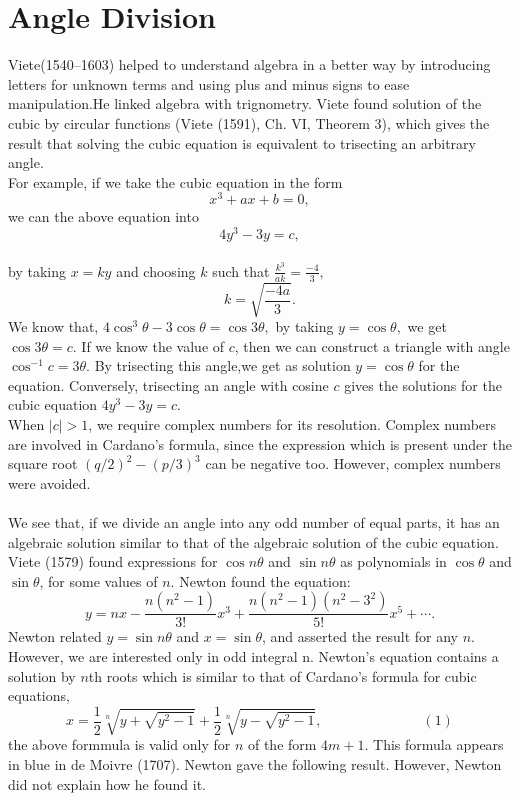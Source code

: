 \documentclass[a4paper,reqno,11pt]{amsart}
\theoremstyle{plain}%
\theoremstyle{definition}
\theoremstyle{remark}
\begin{document}
\section{Angle Division}
Viete(1540–1603) helped to understand algebra in a better way by introducing letters for unknown terms and using plus and minus signs
to ease manipulation.He linked algebra with trignometry. Viete found solution of the cubic by circular functions (Viete (1591),
Ch. VI, Theorem 3), which gives the result that solving the cubic equation is equivalent to trisecting an arbitrary angle.\\
For example, if we take the cubic equation in the form
$$x^3 + ax + b = 0,$$
we can the above equation into
$$4y^3 - 3y = c,$$\\
by taking $x = ky$ and choosing $k$ such that $\frac{k^3}{ak} = \frac{-4}{3},$
$$k = \sqrt{\frac{-4a}{3}}.$$
We know that, $4\cos^3\theta - 3\cos\theta = \cos3\theta,$ by taking $y = \cos\theta,$ we get $\cos3\theta = c.$
If we know the value of $c$, then we can construct a triangle with angle $\cos^{-1}c = 3\theta$. By trisecting this angle,we get as solution $y = \cos \theta$ for the equation. 
Conversely, trisecting an angle with cosine $c$ gives the solutions for the cubic equation $4y^3 - 3y = c.$\\
\indent When $|c| > 1$, we require complex numbers for its resolution. Complex numbers are involved in Cardano’s formula, since the expression which is present under the square root $(q/2)^2 - (p/3)^3$ can be negative too. However, complex numbers were avoided.\\
\\
We see that, if we divide an angle into any odd number
of equal parts, it has an algebraic solution similar to that of the algebraic solution of the cubic equation. Viete (1579) found expressions for $\cos n\theta$ and $\sin n\theta$ as polynomials in $\cos \theta$ and $\sin\theta$, for some values of $n$. Newton found the equation:\\
$$y = nx - \frac{n(n^2-1)}{3!}x^3 + \frac{n(n^2-1)(n^2-3^2)}{5!}x^5 + \cdots.$$
Newton related $y = \sin n\theta$ and $x = \sin \theta$, and asserted the result for any $n$. However, we are interested only in odd integral n.
Newton’s equation contains a solution by $n$th roots which is similar to that of Cardano's formula for cubic equations,\\
$$x = \frac{1}{2}\sqrt[n]{y + \sqrt{y^2 - 1}} + \frac{1}{2}\sqrt[n]{y - \sqrt{y^2 - 1}}, \hspace{3cm} (1) $$
the above formmula is valid only for $n$ of the form $4m + 1$. This formula appears in blue in de Moivre (1707)\cite{ref 3}. Newton gave the following result. However, Newton did not explain how he found it.\\
\end{document}

